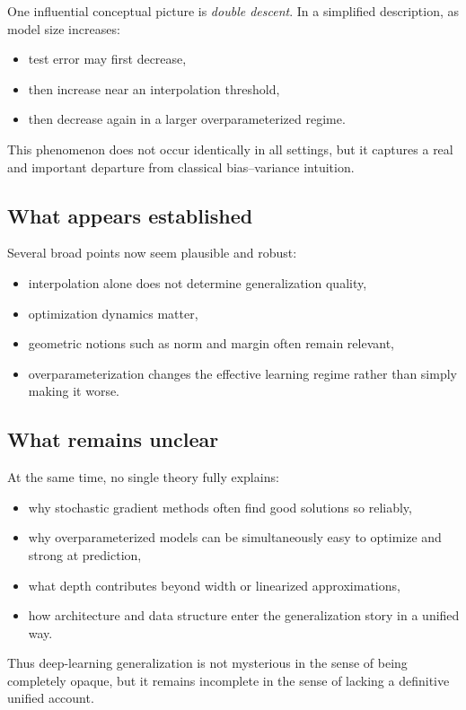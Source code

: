 One influential conceptual picture is \emph{double descent}.
In a simplified description, as model size increases:
\begin{itemize}
    \item test error may first decrease,
    \item then increase near an interpolation threshold,
    \item then decrease again in a larger overparameterized regime.
\end{itemize}

This phenomenon does not occur identically in all settings, but it captures a real and important departure from classical bias--variance intuition.

\subsection*{What appears established}

Several broad points now seem plausible and robust:
\begin{itemize}
    \item interpolation alone does not determine generalization quality,
    \item optimization dynamics matter,
    \item geometric notions such as norm and margin often remain relevant,
    \item overparameterization changes the effective learning regime rather than simply making it worse.
\end{itemize}

\subsection*{What remains unclear}

At the same time, no single theory fully explains:
\begin{itemize}
    \item why stochastic gradient methods often find good solutions so reliably,
    \item why overparameterized models can be simultaneously easy to optimize and strong at prediction,
    \item what depth contributes beyond width or linearized approximations,
    \item how architecture and data structure enter the generalization story in a unified way.
\end{itemize}

Thus deep-learning generalization is not mysterious in the sense of being completely opaque, but it remains incomplete in the sense of lacking a definitive unified account.

